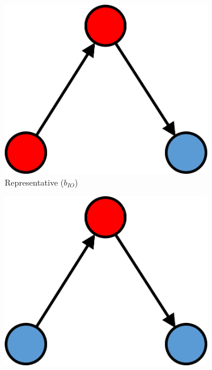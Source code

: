 \begin{figure}
\begin{subfigure}[b]{0.25\textwidth}
  \end{subfigure}
  \hspace{2em}
  \begin{subfigure}[b]{0.25\textwidth}
    \includegraphics[width=\textwidth]{Images/b_IO.png}
    \caption{Representative ($b_{IO}$)}
    \label{fig:3}
  \end{subfigure}
  \par \bigskip
  \begin{subfigure}[b]{0.25\textwidth}
    \includegraphics[width=\textwidth]{Images/w_O.png}

\end{subfigure}
\end{figure}
